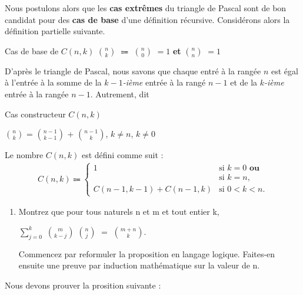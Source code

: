 \documentclass[16pt]{report}
\begin{document}
\begin{multicols*}{2}
    Nous postulons alors que les \textbf{cas extrêmes} du triangle de Pascal sont de bon candidat pour 
    des \textbf{cas de base} d'une définition récursive. Considérons alors la définition partielle suivante. 
    \begin{Definitionx}{Cas de base de $C(n, k)$}{}
       $n \choose k$ $\Coloneqq$ $n \choose 0$ $= 1$ \textbf{et} $n \choose n$ $= 1$      
    \end{Definitionx}

    D'après le triangle de Pascal, nous savons que chaque entré à la rangée $n$ est égal à 
    l'entrée à la somme de la $k-1$\textit{-ième} entrée à la rangé $n-1$ et de la \textit{$k$-ième} entrée 
    à la rangée $n-1$.
    Autrement, dit 
    
    \begin{Definitionx}{Cas constructeur $C(n, k)$}{}
        \begin{center}
        $n \choose k$ =  $n-1 \choose k-1$ + $n -1 \choose k$, $k \neq n$, $k \neq 0$ 
        \end{center}        
    \end{Definitionx}

\begin{Definition}{}{}
    Le nombre \( C(n, k) \) est défini comme suit :
    \begin{align*}
            C(n, k) \Coloneqq
            \begin{cases}
                1 & \text{si } k = 0 \textbf{ ou } \\ 
                  & \text{si } k = n, \\
                C(n-1, k-1) + C(n-1, k) & \text{si } 0 < k < n.
            \end{cases}             
    \end{align*}    
\end{Definition}

    \begin{enumerate}
        \item Montrez que pour tous naturels n et m et tout entier k, 
            \begin{center}
            $ \sum_{j=0}^{k}$ $m \choose k-j$ $n \choose j$ $=$ $m+n \choose k$.  
            \end{center}
        Commencez par reformuler la proposition en langage logique. Faites-en ensuite
        une preuve par induction mathématique sur la valeur de n.
    \end{enumerate}

    Nous devons prouver la prosition suivante : 


\end{multicols*}
\end{document}
